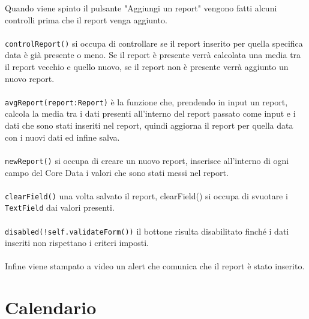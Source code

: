 \documentclass{article}
\begin{document}
Quando viene spinto il pulsante "Aggiungi un report" vengono fatti alcuni controlli prima che il report venga aggiunto. \\
\\
\texttt{controlReport()} si occupa di controllare se il report inserito per quella specifica data è già presente o meno. Se il report è presente verrà calcolata una media tra il report vecchio e quello nuovo, se il report non è presente verrà aggiunto un nuovo report.\\
\\
\texttt{avgReport(report:Report)} è la funzione che, prendendo in input un report, calcola la media tra i dati presenti all'interno del report passato come input e i dati che sono stati inseriti nel report, quindi aggiorna il report per quella data con i nuovi dati ed infine salva.\\
\\
\texttt{newReport()} si occupa di creare un nuovo report, inserisce all'interno di ogni campo del Core Data i valori che sono stati messi nel report.\\
\\
\texttt{clearField()} una volta salvato il report, clearField() si occupa di svuotare i \texttt{TextField} dai valori presenti.\\
\\
\texttt{disabled(!self.validateForm())} il bottone risulta disabilitato finché i dati inseriti non rispettano i criteri imposti.\\
\\
Infine viene stampato a video un alert che comunica che il report è stato inserito.


\newpage
\section{Calendario}
\end{document}
